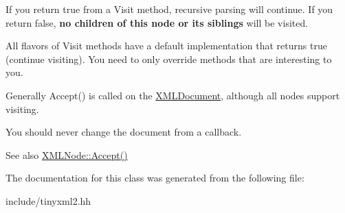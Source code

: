 If you return \textquotesingle{}true\textquotesingle{} from a Visit method, recursive parsing will continue. If you return false, {\bfseries no children of this node or its siblings} will be visited.

All flavors of Visit methods have a default implementation that returns \textquotesingle{}true\textquotesingle{} (continue visiting). You need to only override methods that are interesting to you.

Generally Accept() is called on the \hyperlink{classtinyxml2_1_1XMLDocument}{X\+M\+L\+Document}, although all nodes support visiting.

You should never change the document from a callback.

\begin{DoxySeeAlso}{See also}
\hyperlink{classtinyxml2_1_1XMLNode_a81e66df0a44c67a7af17f3b77a152785}{X\+M\+L\+Node\+::\+Accept()} 
\end{DoxySeeAlso}


The documentation for this class was generated from the following file\+:\begin{DoxyCompactItemize}
\item 
include/tinyxml2.\+hh\end{DoxyCompactItemize}

